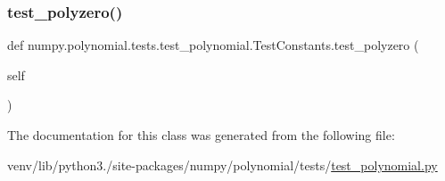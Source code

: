 \subsubsection{\texorpdfstring{test\+\_\+polyzero()}{test\_polyzero()}}
{\footnotesize\ttfamily def numpy.\+polynomial.\+tests.\+test\+\_\+polynomial.\+Test\+Constants.\+test\+\_\+polyzero (\begin{DoxyParamCaption}\item[{}]{self }\end{DoxyParamCaption})}



The documentation for this class was generated from the following file\+:\begin{DoxyCompactItemize}
\item 
venv/lib/python3./site-\/packages/numpy/polynomial/tests/\hyperlink{polynomial_2tests_2test__polynomial_8py}{test\+\_\+polynomial.\+py}\end{DoxyCompactItemize}
